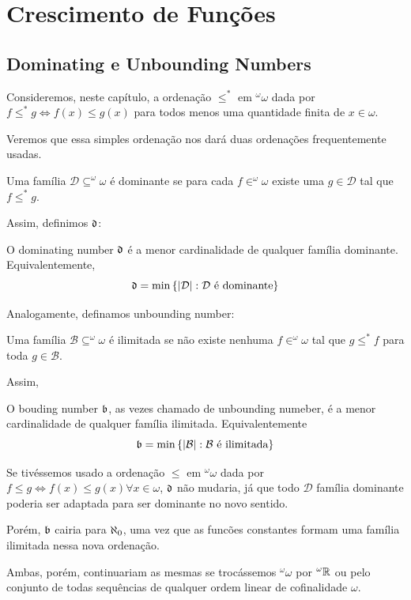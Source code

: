 \chapter{Crescimento de Funções}
\section{Dominating e Unbounding Numbers}
Consideremos, neste capítulo, a ordenação $\leq^*$ em $^\omega \omega$ dada por $f \leq^* g \iff f(x) \leq g(x)$ para todos menos uma quantidade finita de $x \in \omega$. 

Veremos que essa simples ordenação nos dará duas ordenações frequentemente usadas. 

\begin{definition}
    Uma família $\mathcal D \subseteq ^\omega\omega$ é dominante se para cada $f \in ^\omega \omega$ existe uma $g\in \mathcal D$ tal que $f \leq^* g$. 
\end{definition}

Assim, definimos $\mathfrak{d}$:

\begin{definition}
    O dominating number $\mathfrak{d}$ é a menor cardinalidade de qualquer família dominante. Equivalentemente,
    $$
    \mathfrak{d} = \min\left\{ |\mathcal D|: \mathcal D\text{ é dominante} \right\}
    $$
\end{definition}

Analogamente, definamos unbounding number:

\begin{definition}
    Uma família $\mathcal B \subseteq ^\omega\omega$ é ilimitada se não existe nenhuma $f\in ^\omega\omega$ tal que $g\leq^* f$ para toda $g \in \mathcal B$.
\end{definition}

Assim,

\begin{definition}
    O bouding number $\mathfrak{b}$, as vezes chamado de unbounding numeber, é a menor cardinalidade de qualquer família ilimitada. Equivalentemente
    $$
    \mathfrak{b} = \min\left\{ |\mathcal B| : \mathcal B \text{ é ilimitada} \right\}
    $$
    
\end{definition}

\begin{remark}
    Se tivéssemos usado a ordenação $\leq$ em $^\omega\omega$ dada por $f\leq g \iff f(x) \leq g(x) \forall x \in \omega$, $\mathfrak{d}$ não mudaria, já que todo $\mathcal D$ família dominante poderia ser adaptada para ser dominante no novo sentido. 

    Porém, $\mathfrak{b}$ cairia para $\aleph_0$, uma vez que as funcões constantes formam uma família ilimitada nessa nova ordenação.

    Ambas, porém, continuariam as mesmas se trocássemos $^\omega\omega$ por $^\omega\mathbb{R}$ ou pelo conjunto de todas sequências de qualquer ordem linear de cofinalidade $\omega$. 
\end{remark}

